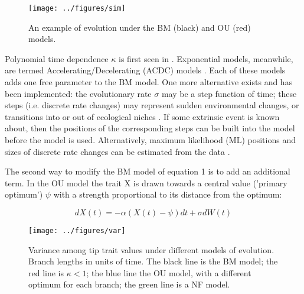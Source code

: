 \documentclass[12pt]{article}
\begin{document}
\begin{figure}[!ht]
	\begin{center}
	\texttt{[image: ../figures/sim]}
	\end{center}
	\vspace{-40pt}	
	\caption{
		An example of evolution under the BM (black) and OU (red) models.
	}
	\label{Figure_label}
\end{figure}

Polynomial time dependence $\kappa$ is first seen in \cite{pagel_inferring_1997}.
Exponential models, meanwhile, are termed Accelerating/Decelerating (ACDC) models \citep{blomberg_testing_2003}. Each of these models adds one free parameter to the BM model.
One more alternative exists and has been implemented: the evolutionary rate $\sigma$ may be a step function of time; these steps (i.e. discrete rate changes) may represent sudden environmental changes, or transitions into or out of ecological niches \citep{thomas_comparative_2006, o'meara_testing_2006}. If some extrinsic event is known about, then the positions of the corresponding steps can be built into the model before the model is used. Alternatively, maximum likelihood (ML) positions and sizes of discrete rate changes can be estimated from the data \citep{thomas_motmot:_2012,revell_new_2012}. 

The second way to modify the BM model of equation 1 is to add an additional term. In the OU model \citep{hansen_stabilizing_1997} the trait X is drawn towards a central value ('primary optimum') $\psi$ with a strength proportional to its distance from the optimum:

\begin{equation}
	dX(t) = - \alpha (X(t) - \psi) dt + \sigma dW(t)
\end{equation}

\begin{figure}[!ht]
	\begin{center}
	\texttt{[image: ../figures/var]}
	\end{center}
	\vspace{-40pt}	
	\caption{
		Variance among tip trait values under different models of evolution. Branch lengths in units of time. The black line is the BM model; the red line is $\kappa < 1$; the blue line the OU model, with a different optimum for each branch; the green line is a NF model.
	}
	\label{Figure_label}
\end{figure}
\vspace{20pt}
\end{document}
